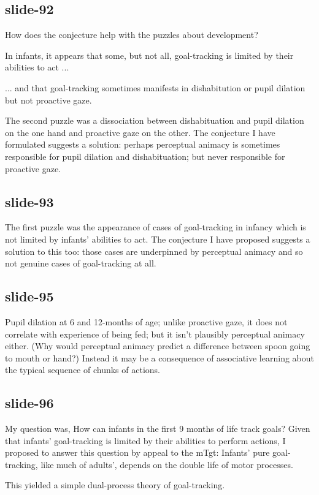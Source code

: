 \documentclass[12pt,\papersize]{extarticle}
\begin{document}
\subsection{slide-92}
How does the conjecture help with the puzzles about development?
 
In infants, 
it appears that 
some, 
but not all, 
goal-tracking is limited by their abilities to act ...
 
... and that goal-tracking sometimes manifests in dishabitution or pupil dilation but not proactive gaze.
 
The second puzzle was a dissociation between dishabituation and pupil dilation on the one
hand and proactive gaze on the other.
The conjecture I have formulated suggests a solution: perhaps perceptual animacy is sometimes
responsible for pupil dilation and dishabituation; but never responsible for proactive gaze.
 
\subsection{slide-93}
The first puzzle was the appearance of cases of goal-tracking in infancy which is not
limited by infants’ abilities to act.
The conjecture I have proposed suggests a solution to this too: those cases 
are underpinned by perceptual animacy and so not genuine cases of goal-tracking at all.
 
\subsection{slide-95}
Pupil dilation at 6 and 12-months of age; unlike proactive gaze, it  does not 
correlate with experience of being fed; but it isn’t plausibly perceptual animacy either.
(Why would perceptual animacy predict a difference between spoon going to mouth or hand?)
Instead it may be a consequence of associative learning about the typical sequence
of chunks of actions.
 
\subsection{slide-96}
My question was, How can infants in the first 9 months of life track goals?
Given that infants’ goal-tracking is limited by their abilities to perform actions,
I proposed to answer this question by appeal to the mTgt:
Infants’ pure goal-tracking, like much of adults’, depends on the double life of motor processes.
 
This yielded a simple dual-process theory of goal-tracking.
 
\end{document}
